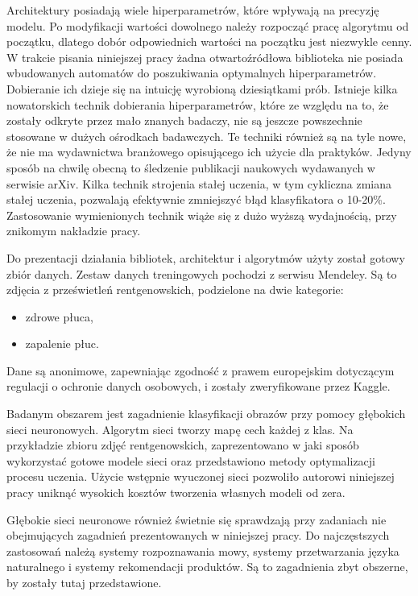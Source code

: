 \documentclass[12pt,a4paper,twoside,titlepage,openright]{book}
\begin{document}
Architektury posiadają wiele hiperparametrów, które wpływają na precyzję modelu. Po modyfikacji wartości dowolnego należy rozpocząć pracę algorytmu od początku, dlatego dobór odpowiednich wartości na początku jest niezwykle cenny. W trakcie pisania niniejszej pracy żadna otwartoźródłowa biblioteka nie posiada wbudowanych automatów do poszukiwania optymalnych hiperparametrów. Dobieranie ich dzieje się na intuicję wyrobioną dziesiątkami prób. Istnieje kilka nowatorskich technik dobierania hiperparametrów, które ze względu na to, że zostały odkryte przez mało znanych badaczy, nie są jeszcze powszechnie stosowane w dużych ośrodkach badawczych. Te techniki również są na tyle nowe, że nie ma wydawnictwa branżowego opisującego ich użycie dla praktyków. Jedyny sposób na chwilę obecną to śledzenie publikacji naukowych wydawanych w serwisie arXiv. Kilka technik strojenia stałej uczenia, w tym cykliczna zmiana stałej uczenia, pozwalają efektywnie zmniejszyć błąd klasyfikatora o 10-20\%. Zastosowanie wymienionych technik wiąże się z dużo wyższą wydajnością, przy znikomym nakładzie pracy. 

Do prezentacji działania bibliotek, architektur i algorytmów użyty został gotowy zbiór danych. Zestaw danych treningowych pochodzi z serwisu Mendeley. Są to zdjęcia z prześwietleń rentgenowskich, podzielone na dwie kategorie:
\begin{itemize}
\item zdrowe płuca,
\item zapalenie płuc.
\end{itemize} 
Dane są anonimowe, zapewniając zgodność z prawem europejskim dotyczącym regulacji o ochronie danych osobowych, i zostały zweryfikowane przez Kaggle.\cite{siteMendeley}

Badanym obszarem jest zagadnienie klasyfikacji obrazów przy pomocy głębokich sieci neuronowych. Algorytm sieci tworzy mapę cech każdej z klas. Na przykładzie zbioru zdjęć rentgenowskich, zaprezentowano w jaki sposób wykorzystać gotowe modele sieci oraz przedstawiono metody optymalizacji procesu uczenia. Użycie wstępnie wyuczonej sieci pozwoliło autorowi niniejszej pracy uniknąć wysokich kosztów tworzenia własnych modeli od zera.

Głębokie sieci neuronowe również świetnie się sprawdzają przy zadaniach nie obejmujących zagadnień prezentowanych w niniejszej pracy. Do najczęstszych zastosowań należą systemy rozpoznawania mowy, systemy przetwarzania języka naturalnego i systemy rekomendacji produktów. Są to zagadnienia zbyt obszerne, by zostały tutaj przedstawione.
\end{document}
